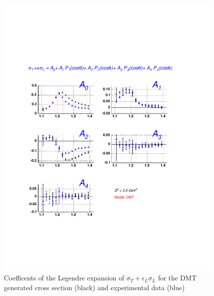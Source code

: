 \begin{figure}[h]
 \begin{center}
 \includegraphics[width = 12cm, bb=30 130 540 700]{analysis/img/A_comp_dmt} 
  \caption[Coefficents of the Legendre expansion of $\sigma_T+\epsilon_L\sigma_L$ for the DMT generated cross 
  section  and experimental data ]
{ Coefficents of the Legendre expansion of $\sigma_T+\epsilon_L\sigma_L$ for the DMT generated cross 
  section (black) and experimental data (blue) }
 \label{fig:A_comp_dmt}
\end{center}
\end{figure}


